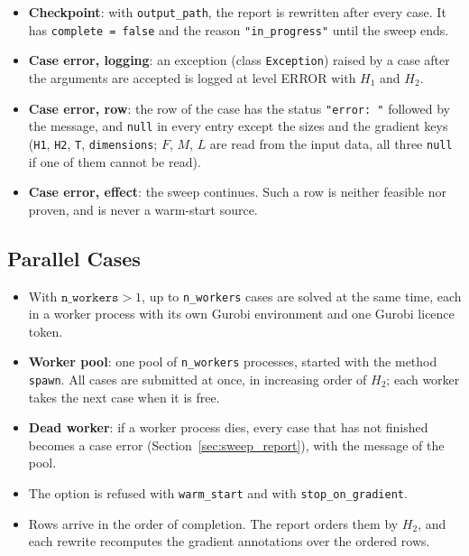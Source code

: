 \begin{itemize}[nosep,leftmargin=1.5em]
  \item \textbf{Checkpoint}: with \texttt{output\_path}, the report is rewritten after every case. It has \texttt{complete = false} and the reason \texttt{"in\_progress"} until the sweep ends.
  \item \textbf{Case error, logging}: an exception (class \texttt{Exception}) raised by a case after the arguments are accepted is logged at level ERROR with $H_1$ and $H_2$.
  \item \textbf{Case error, row}: the row of the case has the status \texttt{"error: "} followed by the message, and \texttt{null} in every entry except the sizes and the gradient keys (\texttt{H1}, \texttt{H2}, \texttt{T}, \texttt{dimensions}; $F$, $M$, $L$ are read from the input data, all three \texttt{null} if one of them cannot be read).
  \item \textbf{Case error, effect}: the sweep continues. Such a row is neither feasible nor proven, and is never a warm-start source.
\end{itemize}

\subsection{Parallel Cases}
\label{sec:sweep_parallel}

\begin{itemize}[nosep,leftmargin=1.5em]
  \item With $\texttt{n\_workers} > 1$, up to \texttt{n\_workers} cases are solved at the same time, each in a worker process with its own Gurobi environment and one Gurobi licence token.
  \item \textbf{Worker pool}: one pool of \texttt{n\_workers} processes, started with the method \texttt{spawn}. All cases are submitted at once, in increasing order of $H_2$; each worker takes the next case when it is free.
  \item \textbf{Dead worker}: if a worker process dies, every case that has not finished becomes a case error (Section~\ref{sec:sweep_report}), with the message of the pool.
  \item The option is refused with \texttt{warm\_start} and with \texttt{stop\_on\_gradient}.
  \item Rows arrive in the order of completion. The report orders them by $H_2$, and each rewrite recomputes the gradient annotations over the ordered rows.
\end{itemize}

